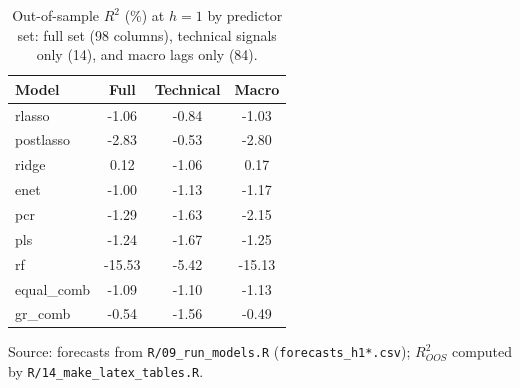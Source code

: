 \begin{table}[H]
\centering
\caption{Out-of-sample $R^2$ (\%) at $h=1$ by predictor set: full set (98 columns), technical signals only (14), and macro lags only (84).}
\label{tab:tableA1}
\normalsize
\begin{threeparttable}
\begin{tabular}{lccc}
\toprule
Model & Full & Technical & Macro \\
\midrule
rlasso & -1.06 & -0.84 & -1.03 \\
postlasso & -2.83 & -0.53 & -2.80 \\
ridge & 0.12 & -1.06 & 0.17 \\
enet & -1.00 & -1.13 & -1.17 \\
pcr & -1.29 & -1.63 & -2.15 \\
pls & -1.24 & -1.67 & -1.25 \\
rf & -15.53 & -5.42 & -15.13 \\
equal\_comb & -1.09 & -1.10 & -1.13 \\
gr\_comb & -0.54 & -1.56 & -0.49 \\
\bottomrule
\end{tabular}
\begin{tablenotes}
\normalsize
\item Source: forecasts from \texttt{R/09\_run\_models.R} (\texttt{forecasts\_h1*.csv}); $R^2_{OOS}$ computed by \texttt{R/14\_make\_latex\_tables.R}.
\end{tablenotes}
\end{threeparttable}
\end{table}
